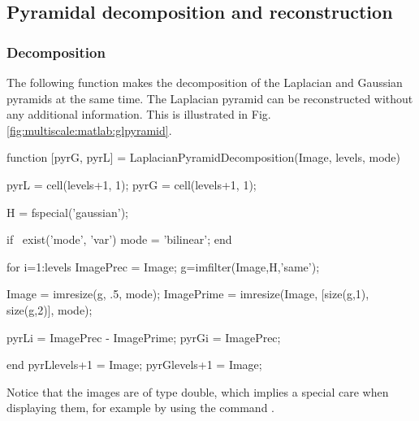 \def\QRCODE{TB_image_TUT.IMG.multiscale_matlabqrcode.png}
\def\QRPAGE{http://www.iptutorials.science/tree/master/TB_image/TUT.IMG.multiscale/matlab}

\subsection{Pyramidal decomposition and re\-cons\-truc\-tion}
\subsubsection{Decomposition}
The following function makes the decomposition of the Laplacian and Gaussian pyramids at the same time. The Laplacian pyramid can be reconstructed without any additional information. This is illustrated in Fig. \ref{fig:multiscale:matlab:glpyramid}.


\begin{matlab}
function [pyrG, pyrL] = LaplacianPyramidDecomposition(Image, levels, mode)
%

pyrL = cell(levels+1, 1);
pyrG = cell(levels+1, 1);

H = fspecial('gaussian');

if ~exist('mode', 'var')
    mode = 'bilinear';
end

for i=1:levels
    ImagePrec = Image; %
    g=imfilter(Image,H,'same');
    
    Image = imresize(g, .5, mode);
    ImagePrime = imresize(Image, [size(g,1), size(g,2)], mode);
    
    pyrL{i} =  ImagePrec - ImagePrime;
    pyrG{i} =  ImagePrec;

end
pyrL{levels+1} = Image;
pyrG{levels+1} = Image;
\end{matlab}

\begin{mcomment}
\begin{mremark}
Notice that the images are of type double, which implies a special care when displaying them, for example by using the command .
\end{mremark}
\end{mcomment}



